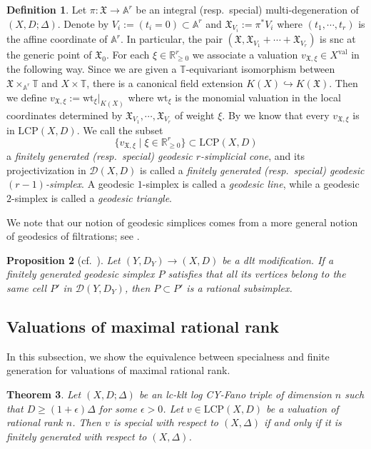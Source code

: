 \documentclass[reqno, 12pt]{amsart}
\newtheorem{prop}{Proposition}[section]
\newtheorem{thm}[prop]{Theorem}
\theoremstyle{definition}
\newtheorem{defn}[prop]{Definition}
\newcommand{\bR}{\mathbb{R}}
\newcommand{\bA}{\mathbb{A}}
\newcommand{\bT}{\mathbb{T}}
\newcommand{\cD}{\mathcal{D}}
\newcommand{\wt}{\mathrm{wt}}
\newcommand{\fX}{\mathfrak{X}}
\newcommand{\val}{\mathrm{val}}
\newcommand{\LCP}{\mathrm{LCP}}
\numberwithin{equation}{section}
\begin{document}
\begin{defn}\label{def:geodesic}
Let $\pi:\fX\to \bA^r$ be an integral (resp.\ special) multi-degeneration of $(X,D;\Delta)$. Denote by $V_i:=(t_i=0)\subset \bA^r$ and $\fX_{V_i}:=\pi^*V_i$ where $(t_1,\cdots,t_r)$ is the affine coordinate of $\bA^r$. In particular, the pair $(\fX,\fX_{V_1}+\cdots + \fX_{V_r})$ is snc at the generic point of $\fX_0$. For each $\xi\in \bR_{\geq 0}^r$ we associate a valuation $v_{\fX,\xi}\in X^{\val}$ in the following way. Since we are given a $\bT$-equivariant isomorphism between $\fX\times_{\bA^r} \bT$ and $X\times\bT$, there is a canonical field extension $K(X) \hookrightarrow K(\fX)$. Then we define $v_{\fX,\xi}:= \wt_{\xi}|_{K(X)}$ where  $\wt_{\xi}$ is the monomial valuation in the local coordinates determined by  $\fX_{V_1},\cdots, \fX_{V_r}$  of weight $\xi$. By \cite{BLX22, Xu21} we know that every $v_{\fX,\xi}$ is in $\LCP(X,D)$. We call the subset
\[
\{v_{\fX,\xi}\mid \xi\in \bR_{\geq 0}^r \}\subset \LCP(X,D)
\]
a \emph{finitely generated (resp.\ special) geodesic $r$-simplicial cone}, and its projectivization in $\cD(X,D)$ is called
a \emph{finitely generated (resp.\ special) geodesic $(r-1)$-simplex}. A geodesic $1$-simplex is called a \emph{geodesic line}, while a geodesic $2$-simplex is called a \emph{geodesic triangle}.
\end{defn}

We note that our notion of geodesic simplices comes from a more general notion of geodesics of filtrations; see \cite[Section 3.1.2]{BLXZ23}.

\begin{prop}[{cf.~\cite[Lemma 4.8]{XZ22}}]\label{prop:geodesic-simplex}
Let $(Y, D_Y) \to (X,D)$ be a dlt modification. If a finitely generated geodesic simplex $P$ satisfies that all its vertices belong to the same cell $P'$ in $\cD(Y, D_Y)$, then $P\subset P'$ is a rational subsimplex.
\end{prop}

\subsection{Valuations of maximal rational rank}\label{sec:max-rank}

In this subsection, we show the equivalence between specialness and finite generation for valuations of maximal rational rank.

\begin{thm}\label{thm:toric}
Let $(X,D;\Delta)$ be an lc-klt log CY-Fano triple of dimension $n$ such that $D\geq (1+\epsilon)\Delta$ for some $\epsilon>0$. Let $v\in \LCP(X,D)$ be a valuation of rational rank $n$. Then $v$ is special with respect to $(X,\Delta)$ if and only if it is  finitely generated with respect to $(X,\Delta)$.
\end{thm}
\end{document}
